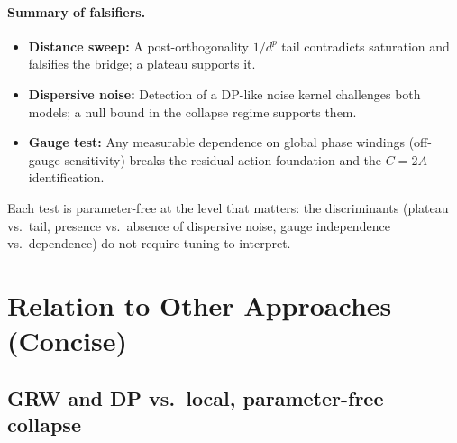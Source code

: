 \documentclass[11pt,letterpaper]{article}
\theoremstyle{definition}
\begin{document}
\paragraph{Summary of falsifiers.}
\begin{itemize}
\item \textbf{Distance sweep:} A post-orthogonality $1/d^p$ tail contradicts saturation and falsifies the bridge; a plateau supports it.\item \textbf{Dispersive noise:} Detection of a DP-like noise kernel challenges both models; a null bound in the collapse regime supports them.\item \textbf{Gauge test:} Any measurable dependence on global phase windings (off-gauge sensitivity) breaks the residual-action foundation and the $C=2A$ identification.\end{itemize}
Each test is parameter-free at the level that matters: the discriminants (plateau vs.\ tail, presence vs.\ absence of dispersive noise, gauge independence vs.\ dependence) do not require tuning to interpret.

\section{Relation to Other Approaches (Concise)}

\subsection*{GRW and DP vs.\ local, parameter-free collapse}
\end{document}
